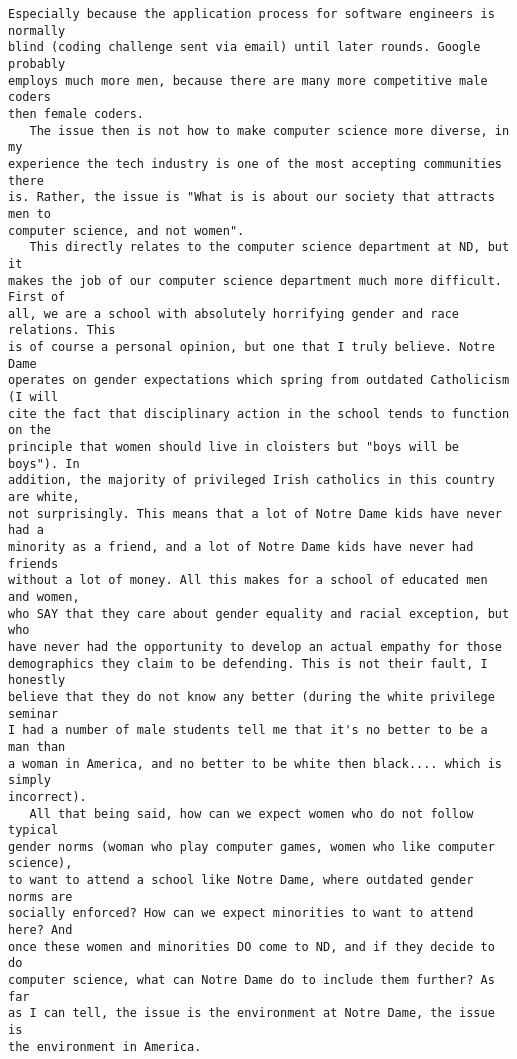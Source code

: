 \documentclass{article}
\begin{document}
\begin{verbatim}
Especially because the application process for software engineers is normally
blind (coding challenge sent via email) until later rounds. Google probably
employs much more men, because there are many more competitive male coders
then female coders.
   The issue then is not how to make computer science more diverse, in my 
experience the tech industry is one of the most accepting communities there
is. Rather, the issue is "What is is about our society that attracts men to 
computer science, and not women".
   This directly relates to the computer science department at ND, but it 
makes the job of our computer science department much more difficult. First of
all, we are a school with absolutely horrifying gender and race relations. This
is of course a personal opinion, but one that I truly believe. Notre Dame 
operates on gender expectations which spring from outdated Catholicism (I will
cite the fact that disciplinary action in the school tends to function on the
principle that women should live in cloisters but "boys will be boys"). In 
addition, the majority of privileged Irish catholics in this country are white,
not surprisingly. This means that a lot of Notre Dame kids have never had a
minority as a friend, and a lot of Notre Dame kids have never had friends 
without a lot of money. All this makes for a school of educated men and women,
who SAY that they care about gender equality and racial exception, but who 
have never had the opportunity to develop an actual empathy for those 
demographics they claim to be defending. This is not their fault, I honestly
believe that they do not know any better (during the white privilege seminar 
I had a number of male students tell me that it's no better to be a man than 
a woman in America, and no better to be white then black.... which is simply
incorrect).
   All that being said, how can we expect women who do not follow typical 
gender norms (woman who play computer games, women who like computer science), 
to want to attend a school like Notre Dame, where outdated gender norms are 
socially enforced? How can we expect minorities to want to attend here? And 
once these women and minorities DO come to ND, and if they decide to do 
computer science, what can Notre Dame do to include them further? As far
as I can tell, the issue is the environment at Notre Dame, the issue is 
the environment in America. 						
	\end{verbatim}
\end{document}
